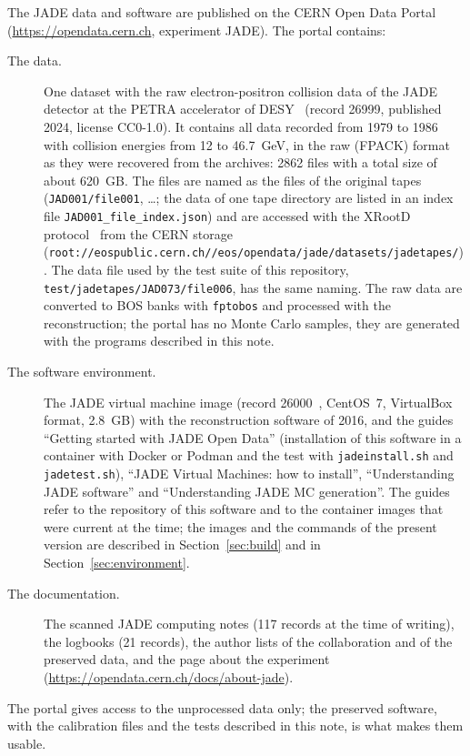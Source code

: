 The JADE data and software are published on the CERN Open Data Portal (\url{https://opendata.cern.ch}, experiment
JADE). The portal contains:
\begin{description}
\item[The data.] One dataset with the raw electron-positron collision data of the JADE detector at the PETRA
accelerator of DESY~\cite{OpenData:JADE} (record 26999, published 2024, license CC0-1.0). It contains all data
recorded from 1979 to 1986 with collision energies from 12 to 46.7~GeV, in the raw (FPACK) format as they were
recovered from the archives: 2862 files with a total size of about 620~GB. The files are named as the files of
the original tapes (\texttt{JAD001/\allowbreak{}file001}, \dots; the data of one tape directory are listed in an index file
\texttt{JAD001\_\allowbreak{}file\_\allowbreak{}index.json}) and are accessed with the XRootD protocol~\cite{Dorigo:XRootD} from the CERN storage
(\texttt{root:/\allowbreak{}/\allowbreak{}eospublic.cern.ch/\allowbreak{}/\allowbreak{}eos/\allowbreak{}opendata/\allowbreak{}jade/\allowbreak{}datasets/\allowbreak{}jadetapes/\allowbreak{}}). The data file used by the test suite of
this repository, \texttt{test/\allowbreak{}jadetapes/\allowbreak{}JAD073/\allowbreak{}file006}, has the same naming. The raw data are converted to BOS
banks with \texttt{fptobos} and processed with the reconstruction; the portal has no Monte Carlo samples, they
are generated with the programs described in this note.
\item[The software environment.] The JADE virtual machine image (record 26000~\cite{OpenData:JADEVM}, CentOS~7,
VirtualBox format, 2.8~GB) with the reconstruction software of 2016, and the guides ``Getting started with JADE
Open Data'' (installation of this software in a container with Docker or Podman and the test with
\texttt{jadeinstall.sh} and \texttt{jadetest.sh}), ``JADE Virtual Machines: how to install'', ``Understanding
JADE software'' and ``Understanding JADE MC generation''. The guides refer to the repository of this software
and to the container images that were current at the time; the images and the commands of the present version are
described in Section~\ref{sec:build} and in Section~\ref{sec:environment}.
\item[The documentation.] The scanned JADE computing notes (117 records at the time of writing), the logbooks
(21 records), the author lists of the collaboration and of the preserved data, and the page about the experiment
(\url{https://opendata.cern.ch/docs/about-jade}).
\end{description}
The portal gives access to the unprocessed data only; the preserved software, with the calibration files and the tests
described in this note, is what makes them usable.

